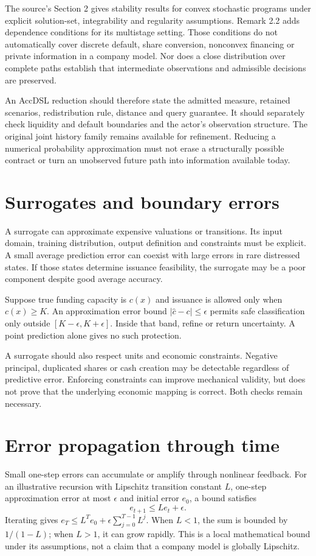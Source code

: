 The source's Section 2 gives stability results for convex stochastic programs under explicit solution-set, integrability and regularity assumptions. Remark 2.2 adds dependence conditions for its multistage setting. Those conditions do not automatically cover discrete default, share conversion, nonconvex financing or private information in a company model. Nor does a close distribution over complete paths establish that intermediate observations and admissible decisions are preserved.

An AccDSL reduction should therefore state the admitted measure, retained scenarios, redistribution rule, distance and query guarantee. It should separately check liquidity and default boundaries and the actor's observation structure. The original joint history family remains available for refinement. Reducing a numerical probability approximation must not erase a structurally possible contract or turn an unobserved future path into information available today.

\section{Surrogates and boundary errors}
A surrogate can approximate expensive valuations or transitions. Its input domain, training distribution, output definition and constraints must be explicit. A small average prediction error can coexist with large errors in rare distressed states. If those states determine issuance feasibility, the surrogate may be a poor component despite good average accuracy.

Suppose true funding capacity is $c(x)$ and issuance is allowed only when $c(x)\geq K$. An approximation error bound $|\hat c-c|\leq\epsilon$ permits safe classification only outside $[K-\epsilon,K+\epsilon]$. Inside that band, refine or return uncertainty. A point prediction alone gives no such protection.

A surrogate should also respect units and economic constraints. Negative principal, duplicated shares or cash creation may be detectable regardless of predictive error. Enforcing constraints can improve mechanical validity, but does not prove that the underlying economic mapping is correct. Both checks remain necessary.

\section{Error propagation through time}
Small one-step errors can accumulate or amplify through nonlinear feedback. For an illustrative recursion with Lipschitz transition constant $L$, one-step approximation error at most $\epsilon$ and initial error $e_0$, a bound satisfies
\begin{equation}
 e_{t+1}\leq Le_t+\epsilon.
\end{equation}
Iterating gives $e_T\leq L^Te_0+\epsilon\sum_{j=0}^{T-1}L^j$. When $L<1$, the sum is bounded by $1/(1-L)$; when $L>1$, it can grow rapidly. This is a local mathematical bound under its assumptions, not a claim that a company model is globally Lipschitz.

